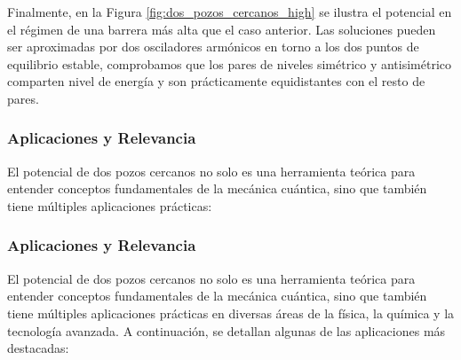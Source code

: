\documentclass[a4paper,12pt]{article}
\begin{document}
\noindent
Finalmente, en la Figura \ref{fig:dos_pozos_cercanos_high} se ilustra el potencial en el régimen de una barrera más alta que el caso anterior. Las soluciones pueden ser aproximadas por dos osciladores armónicos en torno a los dos puntos de equilibrio estable, comprobamos que los pares de niveles simétrico y antisimétrico comparten nivel de energía y son prácticamente equidistantes con el resto de pares.

\subsubsection{Aplicaciones y Relevancia}

El potencial de dos pozos cercanos no solo es una herramienta teórica para entender conceptos fundamentales de la mecánica cuántica, sino que también tiene múltiples aplicaciones prácticas:

\subsubsection{Aplicaciones y Relevancia}

El potencial de dos pozos cercanos no solo es una herramienta teórica para entender conceptos fundamentales de la mecánica cuántica, sino que también tiene múltiples aplicaciones prácticas en diversas áreas de la física, la química y la tecnología avanzada. A continuación, se detallan algunas de las aplicaciones más destacadas:
\end{document}

